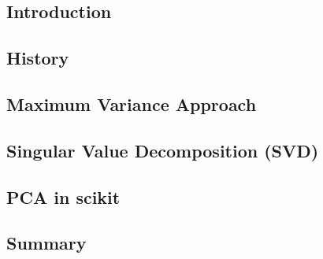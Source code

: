 

\subsection{Introduction}


\clearpage




\subsection{History}

\clearpage




\subsection{Maximum Variance Approach} \label{section:standardApproach}

\clearpage




\subsection{Singular Value Decomposition (SVD)}

\clearpage



\subsection{PCA in scikit}

\clearpage


\subsection{Summary}

\clearpage
